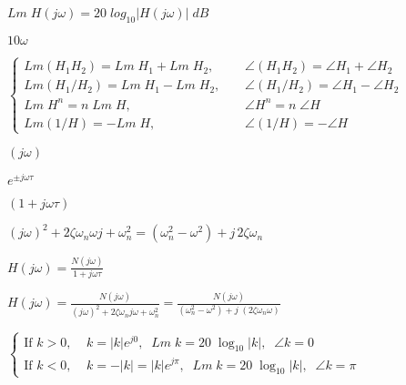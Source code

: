 \documentclass{article}
\def\lthtmlcheckvsize{\ifdim\ht\sizebox<\vsize 
  \ifdim\wd\sizebox<\hsize\expandafter\hfill\fi \expandafter\vfill
  \else\expandafter\vss\fi}%
\begin{document}
{\newpage\clearpage
{}%
$\displaystyle Lm\; H(j\omega)=20 \;log_{10} |H(j\omega)|\;dB$%
\lthtmlindisplaymathZ
\lthtmlcheckvsize\clearpage}

{\newpage\clearpage
{}%
$ 10 \omega$%
\lthtmlindisplaymathZ
\lthtmlcheckvsize\clearpage}

{\newpage\clearpage
{}%
$\displaystyle \left\{ \begin{array}{ll}
Lm(H_1H_2)=Lm\;H_1+Lm\;H_2,&\;\;\;\;\angle (H_1H_2)=\angle H_1+\angle H_2\\
Lm(H_1/H_2)=Lm\;H_1-Lm\;H_2,&\;\;\;\;\angle (H_1/H_2)=\angle H_1-\angle H_2\\
Lm \;H^n=n\;Lm \;H,&\;\;\;\;\angle H^n=n\;\angle H \\
Lm (1/H)=-Lm\;H,&\;\;\;\;\angle (1/H)=-\angle H \end{array} \right.$%
\lthtmlindisplaymathZ
\lthtmlcheckvsize\clearpage}

{\newpage\clearpage
{}%
$ (j\omega)$%
\lthtmlindisplaymathZ
\lthtmlcheckvsize\clearpage}

{\newpage\clearpage
{}%
$ e^{\pm j\omega \tau}$%
\lthtmlindisplaymathZ
\lthtmlcheckvsize\clearpage}

{\newpage\clearpage
{}%
$ (1+j\omega\tau)$%
\lthtmlindisplaymathZ
\lthtmlcheckvsize\clearpage}

{\newpage\clearpage
{}%
$ (j\omega)^2+2\zeta\omega_n\omega j+\omega_n^2
    =(\omega_n^2-\omega^2)+j\,2\zeta\omega_n$%
\lthtmlindisplaymathZ
\lthtmlcheckvsize\clearpage}

{\newpage\clearpage
{}%
$\displaystyle H(j\omega)=\frac{N(j\omega)}{1+j\omega \tau}$%
\lthtmlindisplaymathZ
\lthtmlcheckvsize\clearpage}

{\newpage\clearpage
{}%
$\displaystyle H(j\omega)=\frac{N(j\omega)}{(j\omega)^2+2\zeta\omega_n j\omega +\omega_n^2}
=\frac{N(j\omega)}{(\omega_n^2-\omega^2)+j\;(2\zeta\omega_n \omega) }$%
\lthtmlindisplaymathZ
\lthtmlcheckvsize\clearpage}

{\newpage\clearpage
{}%
$\displaystyle \left\{ \begin{array}{l}
\mbox{If $k>0, \;\;\;\;k=|k|e^{j0}, \;\;Lm\;k=20 \;\log_{10}|k|,\;\;\angle k=0$} \\
\mbox{If $k<0, \;\;\;\;k=-|k|=|k|e^{j\pi}, \;\;Lm\;k=20\;\log_{10}|k|,\;\;\angle k=\pi$}
\end{array} \right.$%
\lthtmlindisplaymathZ
\lthtmlcheckvsize\clearpage}
\end{document}
